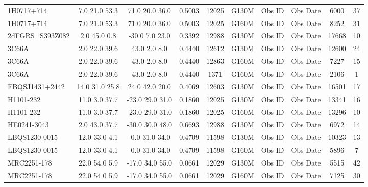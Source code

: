 \documentclass[iop]{emulateapj-rtx4}
\begin{document}
\begin{table}[ht]
\begin{center}
\begin{tabular}{l c c c c c c c c c}
 
1H0717+714  &              7.0  21.0  53.3  &    71.0  20.0  36.0  &    0.5003  & 12025  &   G130M  &   Obs ID  & Obs Date  & 6000  &       37         \\
1H0717+714  &              7.0  21.0  53.3  &    71.0  20.0  36.0  &    0.5003  & 12025  &   G160M  &   Obs ID  & Obs Date  & 8252  &       31         \\
2dFGRS\_S393Z082  &         2.0  45.0  0.8  &     -30.0  7.0  23.0  &    0.3392  & 12988  &   G130M  &   Obs ID  & Obs Date  & 17668  &      10         \\
3C66A  &                   2.0  22.0  39.6  &    43.0  2.0  8.0  &      0.4440  & 12612  &   G130M  &   Obs ID  & Obs Date  & 12600  &      24         \\
3C66A  &                   2.0  22.0  39.6  &    43.0  2.0  8.0  &      0.4440  & 12863  &   G160M  &   Obs ID  & Obs Date  & 7227  &       15         \\
3C66A  &                   2.0  22.0  39.6  &    43.0  2.0  8.0  &      0.4440  & 1371  &    G160M  &   Obs ID  & Obs Date  & 2106  &       1          \\
FBQSJ1431+2442  &          14.0  31.0  25.8  &   24.0  42.0  20.0  &    0.4069  & 12603  &   G130M  &   Obs ID  & Obs Date  & 16501  &      17         \\
H1101-232  &               11.0  3.0  37.7  &    -23.0  29.0  31.0  &   0.1860  & 12025  &   G130M  &   Obs ID  & Obs Date  & 13341  &      16         \\
H1101-232  &               11.0  3.0  37.7  &    -23.0  29.0  31.0  &   0.1860  & 12025  &   G160M  &   Obs ID  & Obs Date  & 13296  &      10         \\
HE0241-3043  &             2.0  43.0  37.7  &    -30.0  30.0  48.0  &   0.6693  & 12988  &   G130M  &   Obs ID  & Obs Date  & 6972  &       14         \\
LBQS1230-0015  &           12.0  33.0  4.1  &    -0.0  31.0  34.0  &    0.4709  & 11598  &   G130M  &   Obs ID  & Obs Date  & 10323  &      13         \\
LBQS1230-0015  &           12.0  33.0  4.1  &    -0.0  31.0  34.0  &    0.4709  & 11598  &   G160M  &   Obs ID  & Obs Date  & 5896  &       7          \\
MRC2251-178  &             22.0  54.0  5.9  &    -17.0  34.0  55.0  &   0.0661  & 12029  &   G130M  &   Obs ID  & Obs Date  & 5515  &       42         \\
MRC2251-178  &             22.0  54.0  5.9  &    -17.0  34.0  55.0  &   0.0661  & 12029  &   G160M  &   Obs ID  & Obs Date  & 7125  &       30         \\

\end{tabular}
\end{center}
\end{table}
\end{document}
